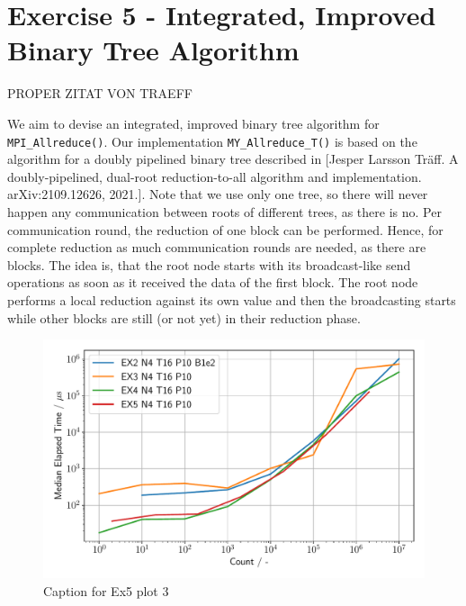 \section{Exercise 5 - Integrated, Improved Binary Tree Algorithm}

PROPER ZITAT VON TRAEFF 

We aim to devise an integrated, improved binary tree algorithm for \texttt{MPI\_Allreduce()}. Our 
implementation \texttt{MY\_Allreduce\_T()} is based on the algorithm for a doubly pipelined binary 
tree described in [Jesper Larsson Träff. A doubly-pipelined, dual-root reduction-to-all algorithm and 
implementation. arXiv:2109.12626, 2021.]. Note that we use only one tree, so there will never happen any 
communication between roots of different trees, as there is no. Per communication round, the reduction of 
one block can be performed. Hence, for complete reduction as much communication rounds are needed, 
as there are blocks. The idea is, that the root node starts with its broadcast-like send operations 
as soon as it received the data of the first block. The root node performs a local reduction against 
its own value and then the broadcasting starts while other blocks are still (or not yet) 
in their reduction phase. \\

\begin{figure}[h]
    \begin{center}
        \includegraphics[width=1.0\linewidth]{figures/Ex5_3.pdf}
        \caption{Caption for Ex5 plot 3}
        \label{Ex5_3_p}
    \end{center}
\end{figure}

